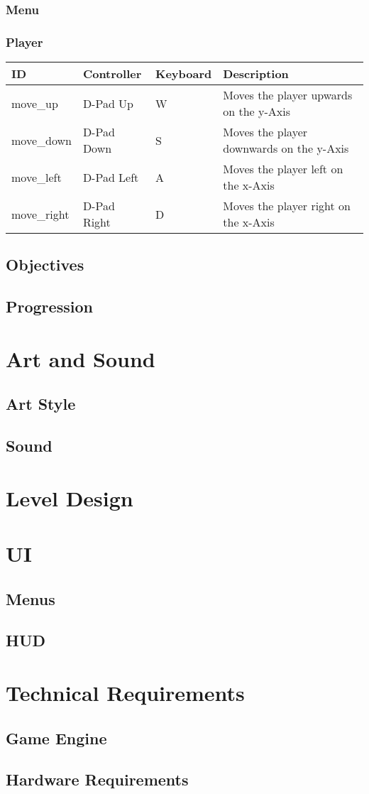 \documentclass[pdftex,12pt,a4paper,ngerman,dvipsnames]{scrreport}
\begin{document}
\subsection{Menu}
\subsection{Player}
\begin{tabular}{l|l|l|l}
  ID & Controller & Keyboard & Description \\ \hline
  move\_up & D-Pad Up & W & Moves the player upwards on the y-Axis \\
  move\_down & D-Pad Down & S & Moves the player downwards on the y-Axis \\
  move\_left & D-Pad Left & A & Moves the player left on the x-Axis \\
  move\_right & D-Pad Right & D & Moves the player right on the x-Axis \\
\end{tabular}
\section{Objectives}
\section{Progression}
\chapter{Art and Sound}
\section{Art Style}
\section{Sound}
\chapter{Level Design}
\chapter{UI}
\section{Menus}
\section{HUD}
\chapter{Technical Requirements}
\section{Game Engine}
\section{Hardware Requirements}
\end{document}
